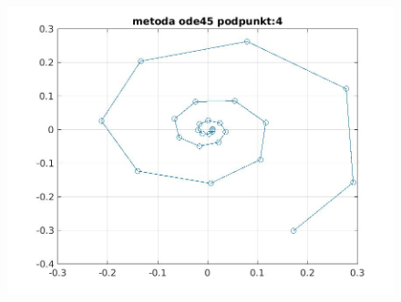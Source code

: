 \documentclass[a4paper, 11pt]{article}
\begin{document}
\begin{figure}[htp]
\centering
\includegraphics[width = 15cm]{ode/metoda ode45 podpunkt:4.jpg}
\end{figure}
\end{document}
